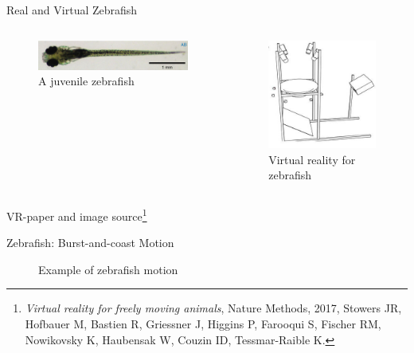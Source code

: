 \documentclass{beamer}
\begin{document}
\begin{frame}{Real and Virtual Zebrafish}
\begin{columns}
   \begin{column}{0.5\textwidth}
     \begin{figure}[h]
       \centering
\includegraphics[clip, width=1\linewidth]{zebrafish.jpg}
       \caption*{A juvenile zebrafish}
     \end{figure}
   \end{column}
   
   \begin{column}{0.5\textwidth}
     \begin{figure}[h]
       \centering
\includegraphics[clip, width=0.6\linewidth]{vr_zebrafish.jpg}
       \caption*{Virtual reality for zebrafish}
     \end{figure}
   \end{column}
\end{columns}
VR-paper and image source\footnote{\textit{Virtual reality for freely moving animals}, Nature Methods, 2017, Stowers JR, Hofbauer M, Bastien R, Griessner J, Higgins P, Farooqui S, Fischer RM, Nowikovsky K, Haubensak W, Couzin ID, Tessmar-Raible K. }
\end{frame}

\begin{frame}{Zebrafish: Burst-and-coast Motion} 
    \begin{figure}[H]
    \centering
    \caption*{Example of zebrafish motion}
    \label{fig:calovi-sim}
  \end{figure}
\end{frame}
\end{document}
